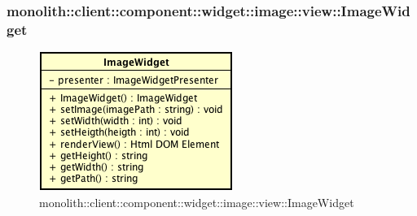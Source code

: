 \subsubsection{monolith::client::component::widget::image::view::ImageWidget}

\label{monolith::client::component::widget::image::view::ImageWidget}
\begin{figure}[H]
	\centering
	\includegraphics[scale=0.5]{Sezioni/SottosezioniST/img/ImageWidget.png}
	\caption{monolith::client::component::widget::image::view::ImageWidget}
\end{figure}

